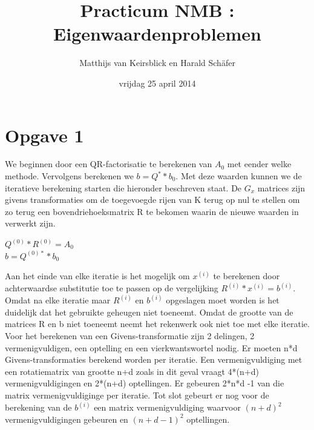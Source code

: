 \documentclass[]{article}
\title{Practicum NMB : Eigenwaardenproblemen}
\author{Matthijs van Keirsblick en Harald Sch\"{a}fer}
\date{vrijdag 25 april 2014}
\newcommand{\opgave}[1]{\section*{Opgave #1}}
\begin{document}
\maketitle
\opgave{1}

We beginnen door een QR-factorisatie te berekenen van $A_{0}$ met eender welke methode. Vervolgens berekenen we $b = Q^{*}*b_{0}$. Met deze waarden kunnen we de iteratieve berekening starten die hieronder beschreven staat. De $G_{x}$ matrices zijn givens transformaties om de toegevoegde rijen van K terug op nul te stellen om zo terug een bovendriehoeksmatrix R te bekomen waarin de nieuwe waarden in verwerkt zijn.

\begin{framed}
\begin{algorithm}[H] 
 $Q^{(0)}*R^{(0)} = A_{0}$\\
 $b = Q^{(0)*}*b_{0}$\\
 
\end{algorithm}
\end{framed}

Aan het einde van elke iteratie is het mogelijk om $x^{(i)}$ te berekenen door achterwaardse substitutie toe te passen op de vergelijking $R^{(i)}*x^{(i)} = b^{(i)}$. Omdat na elke iteratie maar $R^{(i)}$ en  $b^{(i)}$ opgeslagen moet worden is het duidelijk dat het gebruikte geheugen niet toeneemt. Omdat de grootte van de matrices R en b niet toeneemt neemt het rekenwerk ook niet toe met elke iteratie. Voor het berekenen van een Givens-transformatie zijn 2 delingen, 2 vermenigvuldigen, een optelling en een vierkwantswortel nodig. Er moeten n*d Givens-transformaties berekend worden per iteratie. Een vermenigvuldiging met een rotatiematrix van grootte n+d zoals in dit geval vraagt 4*(n+d) vermenigvuldigingen en 2*(n+d) optellingen. Er gebeuren 2*n*d -1 van die matrix vermenigvuldiginge per iteratie. Tot slot  gebeurt er nog voor de berekening van de $b^{(i)}$ een matrix vermenigvuldiging waarvoor $(n+d)^2$ vermenigvuldigingen gebeuren en $(n+d-1)^2$ optellingen.
\end{document}
